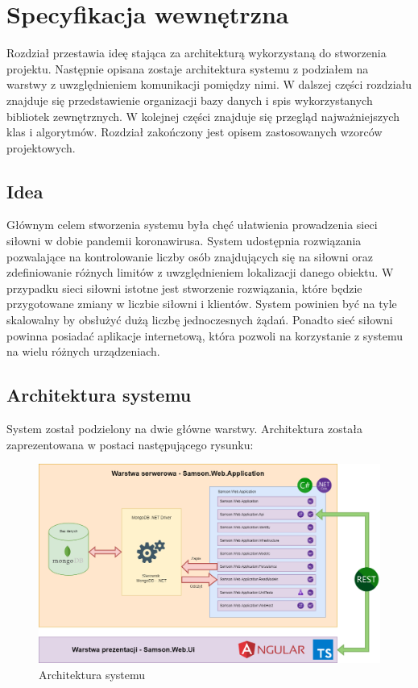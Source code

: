 \documentclass[a4paper,twoside,12pt]{book}
\begin{document}
\chapter{Specyfikacja wewnętrzna}
Rozdział przestawia ideę stająca za architekturą wykorzystaną do stworzenia projektu. Następnie opisana zostaje architektura systemu z podziałem na warstwy z uwzględnieniem komunikacji pomiędzy nimi. W dalszej części rozdziału znajduje się przedstawienie organizacji bazy danych i spis wykorzystanych bibliotek zewnętrznych. W kolejnej części znajduje się przegląd najważniejszych klas i algorytmów. Rozdział zakończony jest opisem zastosowanych wzorców projektowych.

\section{Idea}
Głównym celem stworzenia systemu była chęć ułatwienia prowadzenia sieci siłowni w dobie pandemii koronawirusa. System udostępnia rozwiązania pozwalające na kontrolowanie liczby osób znajdujących się na siłowni oraz zdefiniowanie różnych limitów z uwzględnieniem lokalizacji danego obiektu. W przypadku sieci siłowni istotne jest stworzenie rozwiązania, które będzie przygotowane zmiany w liczbie siłowni i klientów. System powinien być na tyle skalowalny by obsłużyć dużą liczbę jednoczesnych żądań. Ponadto sieć siłowni powinna posiadać aplikacje internetową, która pozwoli na korzystanie z systemu na wielu różnych urządzeniach.

\section{Architektura systemu}
System został podzielony na dwie główne warstwy. Architektura została zaprezentowana w postaci następującego rysunku:
\begin{figure}[H]
	\centering
	\includegraphics[width=1\linewidth]{../diagramy/architektura}
	\caption{Architektura systemu}
	\label{fig:architektura}
\end{figure}
\end{document}
